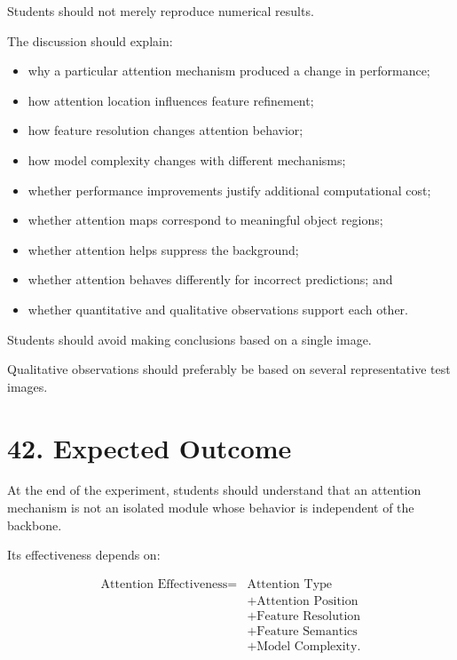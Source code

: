 \documentclass[10pt]{article}
\begin{document}
Students should not merely reproduce numerical results.

The discussion should explain:

\begin{itemize}

\item why a particular attention mechanism produced a change in performance;

\item how attention location influences feature refinement;

\item how feature resolution changes attention behavior;

\item how model complexity changes with different mechanisms;

\item whether performance improvements justify additional computational cost;

\item whether attention maps correspond to meaningful object regions;

\item whether attention helps suppress the background;

\item whether attention behaves differently for incorrect predictions; and

\item whether quantitative and qualitative observations support each other.

\end{itemize}

Students should avoid making conclusions based on a single image.

Qualitative observations should preferably be based on several representative
test images.

\section*{42. Expected Outcome}

At the end of the experiment, students should understand that an attention
mechanism is not an isolated module whose behavior is independent of the
backbone.

Its effectiveness depends on:

\[
\boxed{
\begin{aligned}
\text{Attention Effectiveness}
={}&
\text{Attention Type}\\
&+
\text{Attention Position}\\
&+
\text{Feature Resolution}\\
&+
\text{Feature Semantics}\\
&+
\text{Model Complexity}.
\end{aligned}
}
\]
\end{document}
